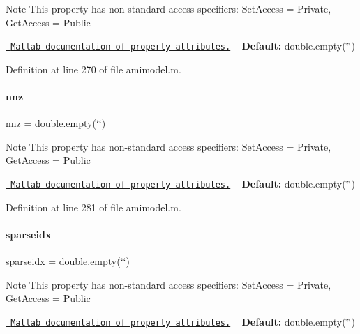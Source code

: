 \begin{DoxyNote}{Note}
This property has non-\/standard access specifiers\+: {\ttfamily Set\+Access = Private, Get\+Access = Public} 

\href{http://www.mathworks.com/help/matlab/matlab_oop/property-attributes.html}{\texttt{ Matlab documentation of property attributes.}} ~\newline
{\bfseries{Default\+:}} double.\+empty(\char`\"{}\char`\"{}) 
\end{DoxyNote}


Definition at line 270 of file amimodel.\+m.

\mbox{\label{classamimodel_a825ec588729c090ff51ea3473dcbc6b9}} 
\paragraph{\texorpdfstring{nnz}{nnz}}
{\footnotesize\ttfamily nnz = double.\+empty(\char`\"{}\char`\"{})}

\begin{DoxyNote}{Note}
This property has non-\/standard access specifiers\+: {\ttfamily Set\+Access = Private, Get\+Access = Public} 

\href{http://www.mathworks.com/help/matlab/matlab_oop/property-attributes.html}{\texttt{ Matlab documentation of property attributes.}} ~\newline
{\bfseries{Default\+:}} double.\+empty(\char`\"{}\char`\"{}) 
\end{DoxyNote}


Definition at line 281 of file amimodel.\+m.

\mbox{\label{classamimodel_a6ffb112eda9ff756e17104210981b30b}} 
\paragraph{\texorpdfstring{sparseidx}{sparseidx}}
{\footnotesize\ttfamily sparseidx = double.\+empty(\char`\"{}\char`\"{})}

\begin{DoxyNote}{Note}
This property has non-\/standard access specifiers\+: {\ttfamily Set\+Access = Private, Get\+Access = Public} 

\href{http://www.mathworks.com/help/matlab/matlab_oop/property-attributes.html}{\texttt{ Matlab documentation of property attributes.}} ~\newline
{\bfseries{Default\+:}} double.\+empty(\char`\"{}\char`\"{}) 
\end{DoxyNote}


